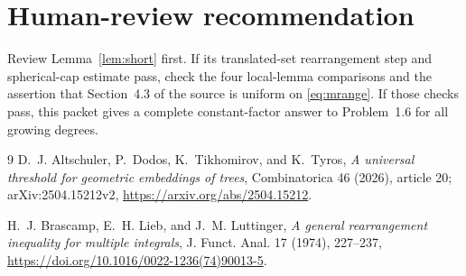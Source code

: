 \documentclass[11pt]{article}
\begin{document}
\section*{Human-review recommendation}

Review Lemma~\ref{lem:short} first. If its translated-set rearrangement step
and spherical-cap estimate pass, check the four local-lemma comparisons and
the assertion that Section~4.3 of the source is uniform on
\eqref{eq:mrange}. If those checks pass, this packet gives a complete
constant-factor answer to Problem~1.6 for all growing degrees.

\small
\begin{thebibliography}{9}
D.~J. Altschuler, P.~Dodos, K.~Tikhomirov, and K.~Tyros,
\emph{A universal threshold for geometric embeddings of trees},
Combinatorica 46 (2026), article 20; arXiv:2504.15212v2,
\url{https://arxiv.org/abs/2504.15212}.

H.~J. Brascamp, E.~H. Lieb, and J.~M. Luttinger,
\emph{A general rearrangement inequality for multiple integrals},
J. Funct. Anal. 17 (1974), 227--237,
\url{https://doi.org/10.1016/0022-1236(74)90013-5}.
\end{thebibliography}
\end{document}
